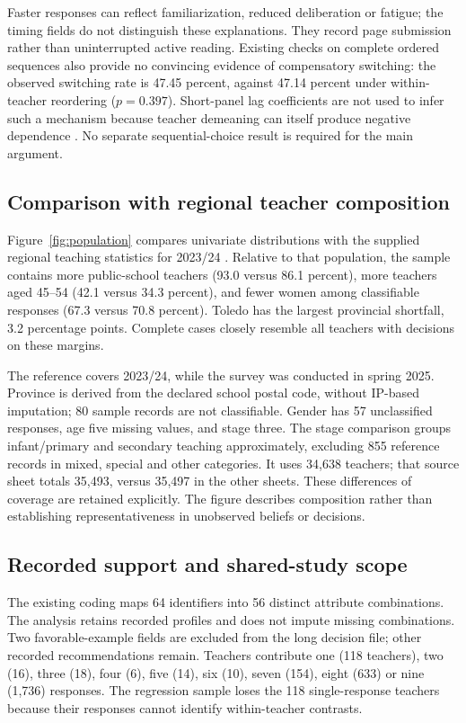 Faster responses can reflect familiarization, reduced deliberation or fatigue; the timing fields do not distinguish these explanations. They record page submission rather than uninterrupted active reading. Existing checks on complete ordered sequences also provide no convincing evidence of compensatory switching: the observed switching rate is 47.45 percent, against 47.14 percent under within-teacher reordering ($p=0.397$). Short-panel lag coefficients are not used to infer such a mechanism because teacher demeaning can itself produce negative dependence \cite{nickell}. No separate sequential-choice result is required for the main argument.

\subsection{Comparison with regional teacher composition}
Figure~\ref{fig:population} compares univariate distributions with the supplied regional teaching statistics for 2023/24 \cite{clm}. Relative to that population, the sample contains more public-school teachers (93.0 versus 86.1 percent), more teachers aged 45--54 (42.1 versus 34.3 percent), and fewer women among classifiable responses (67.3 versus 70.8 percent). Toledo has the largest provincial shortfall, 3.2 percentage points. Complete cases closely resemble all teachers with decisions on these margins.

The reference covers 2023/24, while the survey was conducted in spring 2025. Province is derived from the declared school postal code, without IP-based imputation; 80 sample records are not classifiable. Gender has 57 unclassified responses, age five missing values, and stage three. The stage comparison groups infant/primary and secondary teaching approximately, excluding 855 reference records in mixed, special and other categories. It uses 34,638 teachers; that source sheet totals 35,493, versus 35,497 in the other sheets. These differences of coverage are retained explicitly. The figure describes composition rather than establishing representativeness in unobserved beliefs or decisions.

\subsection{Recorded support and shared-study scope}
The existing coding maps 64 identifiers into 56 distinct attribute combinations. The analysis retains recorded profiles and does not impute missing combinations. Two favorable-example fields are excluded from the long decision file; other recorded recommendations remain. Teachers contribute one (118 teachers), two (16), three (18), four (6), five (14), six (10), seven (154), eight (633) or nine (1,736) responses. The regression sample loses the 118 single-response teachers because their responses cannot identify within-teacher contrasts.

